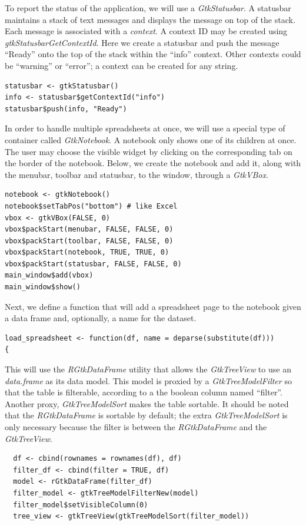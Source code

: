\documentclass[article]{jss}
\begin{document}
To report the status of the application, we will use a \emph{GtkStatusbar}. 
A statusbar maintains a stack of text messages and displays the message
on top of the stack. Each message is associated with a \emph{context}. A context
ID may be created using \emph{gtkStatusbarGetContextId}. Here we create a 
statusbar and push the message ``Ready'' onto the top of the stack within
the ``info'' context. Other contexts could be ``warning'' or ``error''; a context
can be created for any string.
\begin{verbatim}
statusbar <- gtkStatusbar()
info <- statusbar$getContextId("info")
statusbar$push(info, "Ready") 
\end{verbatim}
In order to handle multiple spreadsheets at once, we will use a special type
of container called \emph{GtkNotebook}. A notebook only shows one of its children
at once. The user may choose the visible widget by 
clicking on the corresponding tab on the border of the notebook. Below,
we create the notebook and add it, along with the menubar, toolbar and statusbar, to the
window, through a \emph{GtkVBox}.
\begin{verbatim}
notebook <- gtkNotebook()
notebook$setTabPos("bottom") # like Excel
vbox <- gtkVBox(FALSE, 0)
vbox$packStart(menubar, FALSE, FALSE, 0)
vbox$packStart(toolbar, FALSE, FALSE, 0)
vbox$packStart(notebook, TRUE, TRUE, 0)
vbox$packStart(statusbar, FALSE, FALSE, 0)
main_window$add(vbox)
main_window$show()
\end{verbatim}
Next, we define a function that will add a spreadsheet page to the notebook
given a data frame and, optionally, a name for the dataset.
\begin{verbatim}
load_spreadsheet <- function(df, name = deparse(substitute(df)))
{
\end{verbatim}
This will use the \emph{RGtkDataFrame} utility that allows
the \emph{GtkTreeView} to use an 
\emph{data.frame} as its data model. This model is proxied by a \emph{GtkTreeModelFilter}
so that the table is filterable, according to
a the boolean column named ``filter''. Another proxy, \emph{GtkTreeModelSort}
makes the table sortable. It should be
noted that the \emph{RGtkDataFrame} is sortable by default; the extra 
\emph{GtkTreeModelSort} is only necessary because the filter is between the
\emph{RGtkDataFrame} and the \emph{GtkTreeView}.
\begin{verbatim}
  df <- cbind(rownames = rownames(df), df)
  filter_df <- cbind(filter = TRUE, df)
  model <- rGtkDataFrame(filter_df)
  filter_model <- gtkTreeModelFilterNew(model)
  filter_model$setVisibleColumn(0)
  tree_view <- gtkTreeView(gtkTreeModelSort(filter_model))
\end{verbatim}
\end{document}
